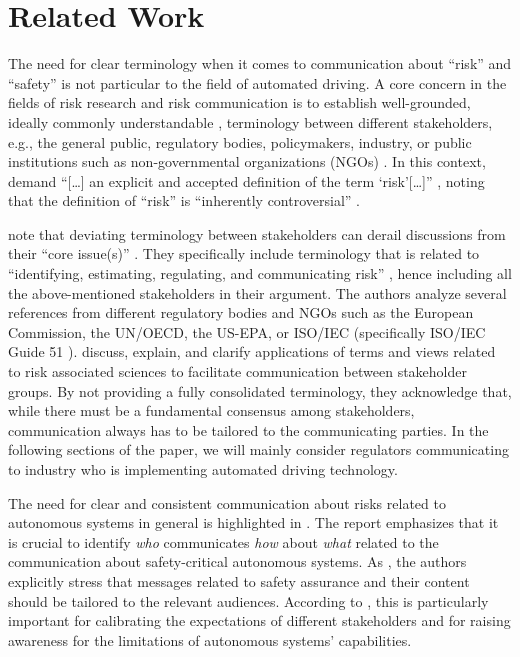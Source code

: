 \section{Related Work}
\label{sec:related-work}
The need for clear terminology when it comes to communication about ``risk'' and ``safety'' is not particular to the field of automated driving.
A core concern in the fields of risk research and risk communication \parencite{renn1998} is to establish well-grounded, ideally commonly understandable \parencite{sellnow2009}, terminology between different stakeholders, e.g., the general public, regulatory bodies, policymakers, industry, or public institutions such as non-governmental organizations (NGOs) \parencite{fischhoff1984,renn1998,christensen2003}.
In this context, \citeauthor{fischhoff1984} demand ``[\ldots] an explicit and accepted definition of the term `risk'[\ldots]'' \parencite[123]{fischhoff1984}, noting that the definition of ``risk'' is ``inherently controversial'' \parencite[124]{fischhoff1984}.

\citeauthor{christensen2003} note that deviating terminology between stakeholders can derail discussions from their ``core issue(s)'' \parencite[182]{christensen2003}.
They specifically include terminology that is related to ``identifying, estimating, regulating, and communicating risk'' \parencite[182]{christensen2003}, hence including all the above-mentioned stakeholders in their argument.
The authors analyze several references from different regulatory bodies and NGOs such as the European Commission, the UN/OECD, the US-EPA, or ISO/IEC (specifically ISO/IEC Guide 51 \parencite{iso51}).
\citeauthor{christensen2003} \parencite{christensen2003} discuss, explain, and clarify applications of terms and views related to risk associated sciences to facilitate communication between stakeholder groups.
By not providing a fully consolidated terminology, they acknowledge that, while there must be a fundamental consensus among stakeholders, communication always has to be tailored to the communicating parties.
In the following sections of the paper, we will mainly consider regulators communicating to industry who is implementing automated driving technology.

The need for clear and consistent communication about risks related to autonomous systems in general is highlighted in \parencite{wmg2023}.
The report emphasizes that it is crucial to identify \emph{who} communicates \emph{how} about \emph{what} related to the communication about safety-critical autonomous systems.
As \parencite{christensen2003}, the authors explicitly stress that messages related to safety assurance and their content should be tailored to the relevant audiences.
According to \parencite{wmg2023}, this is particularly important for calibrating the expectations of different stakeholders and for raising awareness for the limitations of autonomous systems' capabilities.

